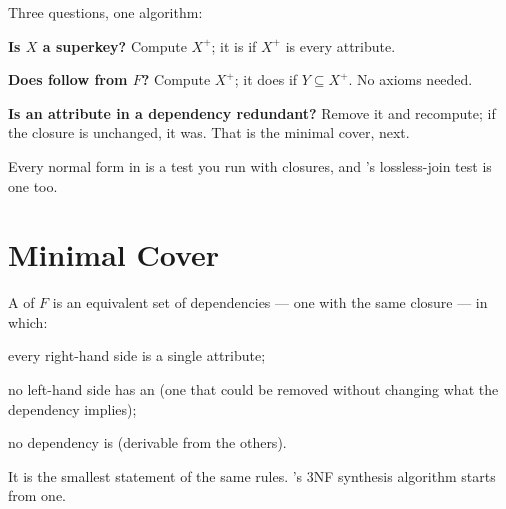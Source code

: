 \begin{conceptbox}
Three questions, one algorithm:

\begin{tight}
  \item \textbf{Is $X$ a superkey?} Compute $X^{+}$; it is if $X^{+}$ is every
        attribute.
  \item \textbf{Does  follow from $F$?} Compute $X^{+}$; it does if
        $Y \subseteq X^{+}$. No axioms needed.
  \item \textbf{Is an attribute in a dependency redundant?} Remove it and
        recompute; if the closure is unchanged, it was. That is the minimal
        cover, next.
\end{tight}

\smallskip
Every normal form in  is a test you run with closures, and
's lossless-join test is one too.
\end{conceptbox}

\section{Minimal Cover}

\begin{definitionbox}
A  of $F$ is an equivalent set of dependencies --- one with
the same closure --- in which:
\begin{tightnum}
  \item every right-hand side is a single attribute;
  \item no left-hand side has an  (one that could be
        removed without changing what the dependency implies);
  \item no dependency is  (derivable from the others).
\end{tightnum}

\smallskip
It is the smallest statement of the same rules. 's 3NF
synthesis algorithm starts from one.
\end{definitionbox}

